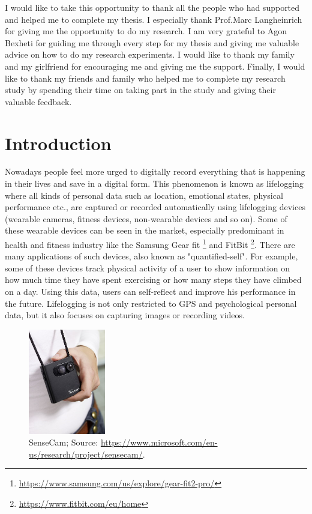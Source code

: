 \documentclass[mscthesis]{usiinfthesis}
\begin{document}
\begin{acknowledgements}
I would like to take this opportunity to thank all the people who had supported and helped me to complete my thesis. I especially thank Prof.Marc Langheinrich for giving me the opportunity to do my research. I am very grateful to Agon Bexheti for guiding me through every step for my thesis and giving me valuable advice on how to do my research experiments. I would like to thank my family and my girlfriend for encouraging me and giving me the support. Finally, I would like to thank my friends and family who helped me to complete my research study by spending their time on taking part in the study and giving their valuable feedback. 
\end{acknowledgements}

\tableofcontents 
\listoffigures %
\listoftables %

\mainmatter

\chapter{Introduction}

Nowadays people feel more urged to digitally record everything that is happening in their lives and save in a digital form. This phenomenon is known as lifelogging where all kinds of personal data such as location, emotional states, physical performance etc., are captured or recorded automatically using lifelogging devices (wearable cameras, fitness devices, non-wearable devices and so on). Some of these wearable devices can be seen in the market, especially predominant in health and fitness industry like the Samsung Gear fit \footnote{\url{https://www.samsung.com/us/explore/gear-fit2-pro/}} and FitBit \footnote{\url{https://www.fitbit.com/eu/home}}. There are many applications of 
such devices, also known as "quantified-self". For example, some of these devices track physical activity of a user to show information on how much time they have spent exercising or how many steps they have climbed on a day. Using this data, users can self-reflect and improve his performance in the future. Lifelogging is not only restricted to GPS and psychological personal data, but it also focuses on capturing images or recording videos.

\begin{figure}[!ht]
  \centering
  \includegraphics[width=0.3\textwidth]{sensecam}
  \caption{SenseCam; Source: \url{https://www.microsoft.com/en-us/research/project/sensecam/}.}
  \label{fig0}
\end{figure}
\end{document}
